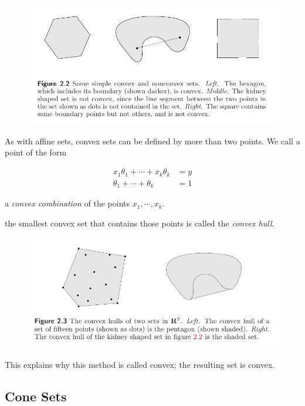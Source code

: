 \documentclass{article}
\begin{document}
\begin{figure}[h!]
    \centering
    \includegraphics[width=1\textwidth]{./figures/ConvexSetExamples.png}
\end{figure}

As with affine sets, convex sets can be defined by more than two points.
We call a point of the form

\begin{align}
    x_1 \theta_1 + \cdots + x_k \theta_k & = y \\
    \theta_1 + \cdots + \theta_k         & = 1
\end{align}

a {\em convex combination\/} of the points $x_1, \cdots, x_k$.

the smallest convex set that contains those points is called the {\em convex hull\/}.

\begin{figure}[h!]
    \centering
    \includegraphics[width=1\textwidth]{./figures/ConvexHullExamples.png}
\end{figure}

This explains why this method is called convex; the resulting set is convex.

\subsection{Cone Sets}
\end{document}
